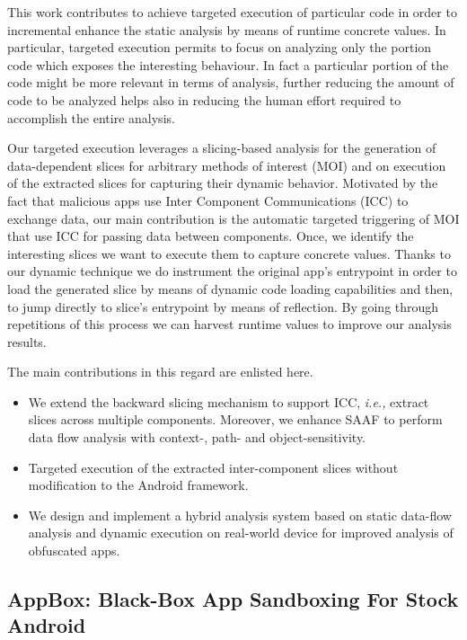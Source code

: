 This work contributes to achieve targeted execution of particular code in order to incremental enhance the static analysis by means of runtime concrete values. In particular, targeted execution permits to focus on analyzing only the portion code which exposes the interesting behaviour. In fact a particular portion of the code might be more relevant in terms of analysis, further reducing the amount of code to be analyzed helps also in reducing the human effort required to accomplish the entire analysis. 

Our targeted execution leverages a slicing-based analysis for the generation of data-dependent slices for arbitrary methods of interest (MOI) and on execution of the extracted slices for capturing their dynamic behavior. Motivated by the fact that malicious apps use Inter Component Communications (ICC) to exchange data, our main contribution is the automatic targeted triggering of MOI that use ICC for passing data between components. Once, we identify the interesting slices we want to execute them to capture concrete values. Thanks to our dynamic technique we do instrument the original app's entrypoint in order to load the generated slice by means of dynamic code loading capabilities and then, to jump directly to slice's entrypoint by means of reflection. By going through repetitions of this process we can harvest runtime values to improve our analysis results.

The main contributions in this regard are enlisted here.

\begin{itemize}
\item We extend the backward slicing mechanism to support ICC, \textit{i.e.,} extract slices across multiple components. Moreover, we enhance SAAF to perform data flow analysis with context-, path- and  object-sensitivity.

\item Targeted execution of the extracted inter-component slices without modification to the Android framework.

\item We design and implement a hybrid analysis system based on static data-flow analysis and dynamic execution on real-world device for improved analysis of obfuscated apps.
\end{itemize}

\subsection{AppBox: Black-Box App Sandboxing For Stock Android}

